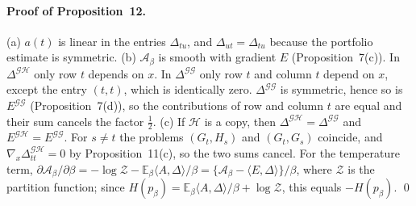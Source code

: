 \documentclass[12pt]{article}
\begin{document}
\paragraph{Proof of Proposition~12.}
(a) $a(t)$ is linear in the entries $\Delta_{tu}$, and $\Delta_{ut}=\Delta_{tu}$ because the portfolio estimate is symmetric. (b) $\mathcal A_\beta$ is smooth with gradient $E$ (Proposition~7(c)). In $\Delta^{\mathcal{GH}}$ only row $t$ depends on $x$. In $\Delta^{\mathcal{GG}}$ only row $t$ and column $t$ depend on $x$, except the entry $(t,t)$, which is identically zero. $\Delta^{\mathcal{GG}}$ is symmetric, hence so is $E^{\mathcal{GG}}$ (Proposition~7(d)), so the contributions of row and column $t$ are equal and their sum cancels the factor $\frac12$. (c) If $\mathcal H$ is a copy, then $\Delta^{\mathcal{GH}}=\Delta^{\mathcal{GG}}$ and $E^{\mathcal{GH}}=E^{\mathcal{GG}}$. For $s\neq t$ the problems $(G_t,H_s)$ and $(G_t,G_s)$ coincide, and $\nabla_x\Delta^{\mathcal{GH}}_{tt}=0$ by Proposition~11(c), so the two sums cancel. For the temperature term, $\partial\mathcal A_\beta/\partial\beta=-\log\mathcal Z-\mathbb E_\beta\langle A,\Delta\rangle/\beta=\{\mathcal A_\beta-\langle E,\Delta\rangle\}/\beta$, where $\mathcal Z$ is the partition function; since $H(p_\beta)=\mathbb E_\beta\langle A,\Delta\rangle/\beta+\log\mathcal Z$, this equals $-H(p_\beta)$. \qed
\end{document}
